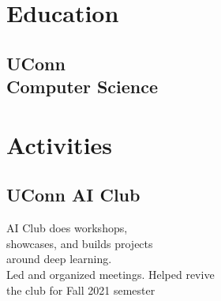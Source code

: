\documentclass[]{resume-template}
\begin{document}
%
%
    \lastupdated{}

%
%

%
%

    \begin{minipage}[t]{0.33\textwidth}


        \section{Education}\label{sec:education}

        \subsection{UConn\\ Computer Science}\label{subsec:uconn-school-of-engineering}

        \sectionsep{}




        \section{Activities}\label{sec:activities}

        \subsection{UConn AI Club}\label{subsec:uconn-ai-club}
        AI Club does workshops,\\showcases, and builds projects\\ around deep learning.\\
        Led and organized meetings.
        Helped revive \\the club for Fall 2021 semester
        \vspace{\topsep}


\end{minipage}
\end{document}
